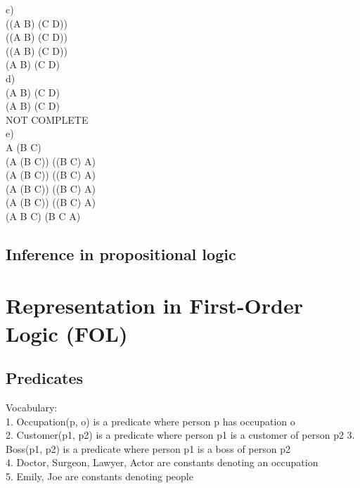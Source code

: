 \documentclass{article}
\begin{document}
c)\\
\neg ((A \Rightarrow B) \wedge (C \Rightarrow D))\\
\neg ((\neg A \vee B) \wedge (\neg C \vee D))\\
(\neg (\neg A \vee B) \wedge \neg(\neg C \vee D))\\
(A \vee \neg B) \wedge (C \vee \neg D)\\

d)\\
(A \wedge B) \vee (C \Rightarrow D)\\
(A \wedge B) \vee (\neg C \vee D)\\
NOT \: COMPLETE\\

e)\\
A \Leftrightarrow (B \Rightarrow \neg C)\\
(A \Rightarrow (B \Rightarrow \neg C)) \wedge ((B \Rightarrow \neg C) \Rightarrow A)\\
(\neg A \vee (B \Rightarrow \neg C)) \wedge (\neg (B \Rightarrow \neg C) \vee A)\\
(\neg A \vee (\neg B \vee \neg C)) \wedge (\neg (\neg B \vee \neg C) \vee A)\\
(\neg A \vee (\neg B \vee \neg C)) \wedge ((B \vee C) \vee A)\\
(\neg A \vee \neg B \vee \neg C) \wedge (B \vee C \vee A)\\

\subsection{Inference in propositional logic}

\section{Representation in First-Order Logic (FOL)}

\subsection{Predicates}
Vocabulary:\\
1. Occupation(p, o) is a predicate where person p has occupation o\\
2. Customer(p1, p2) is a predicate where person p1 is a customer of person p2 3. Boss(p1, p2) is a predicate where person p1 is a boss of person p2\\
4. Doctor, Surgeon, Lawyer, Actor are constants denoting an occupation\\
5. Emily, Joe are constants denoting people\\
\end{document}
